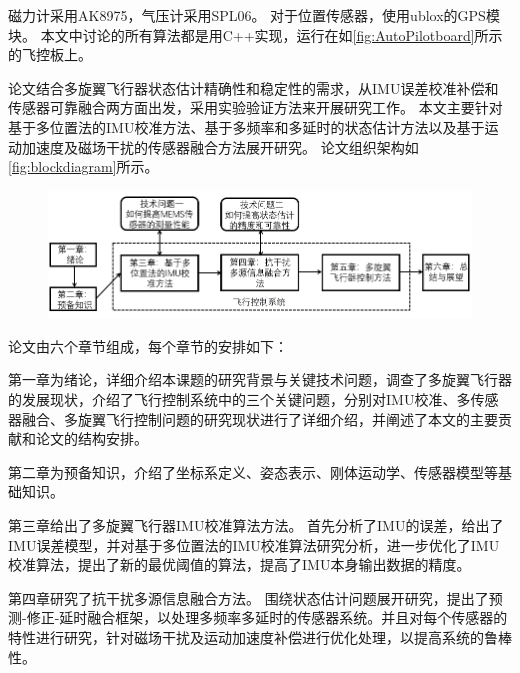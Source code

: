 \documentclass[
  type=master
]{gdutthesis}
\begin{document}
磁力计采用AK8975，气压计采用SPL06。
对于位置传感器，使用ublox的GPS模块。
本文中讨论的所有算法都是用C++实现，运行在如\autoref{fig:AutoPilotboard}所示的飞控板上。

论文结合多旋翼飞行器状态估计精确性和稳定性的需求，从IMU误差校准补偿和传感器可靠融合两方面出发，采用实验验证方法来开展研究工作。
本文主要针对基于多位置法的IMU校准方法、基于多频率和多延时的状态估计方法以及基于运动加速度及磁场干扰的传感器融合方法展开研究。
论文组织架构如\autoref{fig:blockdiagram}所示。
\begin{figure}[H]
	\centering
	\includegraphics[width=1.0\textwidth]{屏幕截图 2022-05-05 153942.png}
	\label{fig:blockdiagram}
\end{figure}

论文由六个章节组成，每个章节的安排如下：

第一章为绪论，详细介绍本课题的研究背景与关键技术问题，调查了多旋翼飞行器的发展现状，介绍了飞行控制系统中的三个关键问题，分别对IMU校准、多传感器融合、多旋翼飞行控制问题的研究现状进行了详细介绍，并阐述了本文的主要贡献和论文的结构安排。

第二章为预备知识，介绍了坐标系定义、姿态表示、刚体运动学、传感器模型等基础知识。

第三章给出了多旋翼飞行器IMU校准算法方法。
首先分析了IMU的误差，给出了IMU误差模型，并对基于多位置法的IMU校准算法研究分析，进一步优化了IMU校准算法，提出了新的最优阈值的算法，提高了IMU本身输出数据的精度。

第四章研究了抗干扰多源信息融合方法。
围绕状态估计问题展开研究，提出了预测-修正-延时融合框架，以处理多频率多延时的传感器系统。并且对每个传感器的特性进行研究，针对磁场干扰及运动加速度补偿进行优化处理，以提高系统的鲁棒性。
\end{document}
